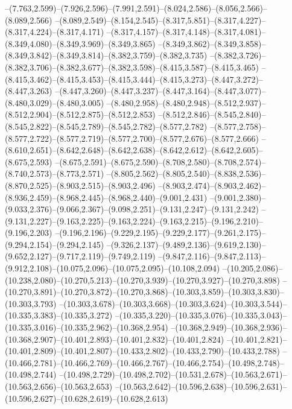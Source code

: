   --(7.763,2.599)--(7.926,2.596)--(7.991,2.591)--(8.024,2.586)--(8.056,2.566)--(8.089,2.566)%
  --(8.089,2.549)--(8.154,2.545)--(8.317,5.851)--(8.317,4.227)--(8.317,4.224)--(8.317,4.171)%
  --(8.317,4.157)--(8.317,4.148)--(8.317,4.081)--(8.349,4.080)--(8.349,3.969)--(8.349,3.865)%
  --(8.349,3.862)--(8.349,3.858)--(8.349,3.842)--(8.349,3.814)--(8.382,3.759)--(8.382,3.735)%
  --(8.382,3.726)--(8.382,3.706)--(8.382,3.677)--(8.382,3.598)--(8.415,3.587)--(8.415,3.465)%
  --(8.415,3.462)--(8.415,3.453)--(8.415,3.444)--(8.415,3.273)--(8.447,3.272)--(8.447,3.263)%
  --(8.447,3.260)--(8.447,3.237)--(8.447,3.164)--(8.447,3.077)--(8.480,3.029)--(8.480,3.005)%
  --(8.480,2.958)--(8.480,2.948)--(8.512,2.937)--(8.512,2.904)--(8.512,2.875)--(8.512,2.853)%
  --(8.512,2.846)--(8.545,2.840)--(8.545,2.822)--(8.545,2.789)--(8.545,2.782)--(8.577,2.782)%
  --(8.577,2.758)--(8.577,2.722)--(8.577,2.719)--(8.577,2.700)--(8.577,2.676)--(8.577,2.666)%
  --(8.610,2.651)--(8.642,2.648)--(8.642,2.638)--(8.642,2.612)--(8.642,2.605)--(8.675,2.593)%
  --(8.675,2.591)--(8.675,2.590)--(8.708,2.580)--(8.708,2.574)--(8.740,2.573)--(8.773,2.571)%
  --(8.805,2.562)--(8.805,2.540)--(8.838,2.536)--(8.870,2.525)--(8.903,2.515)--(8.903,2.496)%
  --(8.903,2.474)--(8.903,2.462)--(8.936,2.459)--(8.968,2.445)--(8.968,2.440)--(9.001,2.431)%
  --(9.001,2.380)--(9.033,2.376)--(9.066,2.367)--(9.098,2.251)--(9.131,2.247)--(9.131,2.242)%
  --(9.131,2.227)--(9.163,2.225)--(9.163,2.224)--(9.163,2.215)--(9.196,2.210)--(9.196,2.203)%
  --(9.196,2.196)--(9.229,2.195)--(9.229,2.177)--(9.261,2.175)--(9.294,2.154)--(9.294,2.145)%
  --(9.326,2.137)--(9.489,2.136)--(9.619,2.130)--(9.652,2.127)--(9.717,2.119)--(9.749,2.119)%
  --(9.847,2.116)--(9.847,2.113)--(9.912,2.108)--(10.075,2.096)--(10.075,2.095)--(10.108,2.094)%
  --(10.205,2.086)--(10.238,2.080)--(10.270,5.213)--(10.270,3.939)--(10.270,3.927)--(10.270,3.898)%
  --(10.270,3.891)--(10.270,3.872)--(10.270,3.868)--(10.303,3.859)--(10.303,3.830)--(10.303,3.793)%
  --(10.303,3.678)--(10.303,3.668)--(10.303,3.624)--(10.303,3.544)--(10.335,3.383)--(10.335,3.272)%
  --(10.335,3.220)--(10.335,3.076)--(10.335,3.043)--(10.335,3.016)--(10.335,2.962)--(10.368,2.954)%
  --(10.368,2.949)--(10.368,2.936)--(10.368,2.907)--(10.401,2.893)--(10.401,2.832)--(10.401,2.824)%
  --(10.401,2.821)--(10.401,2.809)--(10.401,2.807)--(10.433,2.802)--(10.433,2.790)--(10.433,2.788)%
  --(10.466,2.781)--(10.466,2.769)--(10.466,2.767)--(10.466,2.754)--(10.498,2.748)--(10.498,2.744)%
  --(10.498,2.729)--(10.498,2.702)--(10.531,2.678)--(10.563,2.671)--(10.563,2.656)--(10.563,2.653)%
  --(10.563,2.642)--(10.596,2.638)--(10.596,2.631)--(10.596,2.627)--(10.628,2.619)--(10.628,2.613)%
